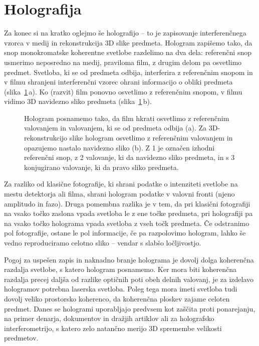 \section{Holografija}
Za konec si na kratko oglejmo še holografijo -- to je zapisovanje interferenčnega vzorca v medij
in rekonstrukcija 3D slike predmeta. Hologram zapišemo tako, da snop monokromatske
koherentne svetlobe razdelimo na dva dela: referenčni snop usmerimo neposredno na medij, 
praviloma film, z drugim
delom pa osvetlimo predmet. Svetloba, ki se od predmeta odbija, interferira z referenčnim
snopom in v filmu shranjeni interferenčni vzorec ohrani informacijo o obliki predmeta 
(slika~\ref{fig:08_hologram}\,a). Ko
(razvit) film ponovno osvetlimo z referenčnim snopom, v filmu vidimo 3D navidezno 
sliko predmeta (slika~\ref{fig:08_hologram}\,b).
\begin{figure}[ht]
\centering
\def\svgwidth{130truemm} 

\caption{Hologram posnamemo tako, da film hkrati osvetlimo z referenčnim valovanjem in 
valovanjem, ki se od predmeta odbija (a). Za 3D-rekonstrukcijo slike hologram osvetlimo
z referenčnim valovanjem in opazujemo nastalo navidezno sliko (b). Z 1 je označen izhodni referenčni
snop, z 2 valovanje, ki da navidezno sliko predmeta, in s 3 konjugirano 
valovanje, ki da pravo sliko predmeta. 
}
\label{fig:08_hologram}
\end{figure}

Za razliko od klasične fotografije, ki shrani podatke o intenziteti svetlobe
na mestu detektorja ali filma, shrani hologram podatke v valovni fronti (njeno 
amplitudo in fazo). Druga pomembna razlika je v tem, da pri klasični fotografiji na vsako točko
zaslona vpada svetloba le z ene točke predmeta, pri holografiji pa na vsako točko holograma
vpada svetloba z vseh točk predmeta. Če odstranimo pol fotografije, ostane le pol informacije, 
če pa razpolovimo hologram, lahko še vedno reproduciramo celotno sliko -- vendar s slabšo 
ločljivostjo.

Pogoj za uspešen zapis in naknadno branje holograma je dovolj dolga koherenčna razdalja svetlobe, 
s katero hologram posnamemo. Ker mora biti koherenčna razdalja precej daljša od razlike
optičnih poti obeh delnih valovanj, je za izdelavo hologramov potrebna laserska svetloba.
Poleg tega mora imeti svetloba tudi dovolj veliko prostorsko koherenco, da koherenčna
ploskev zajame celoten predmet. Danes se hologrami uporabljajo predvsem kot zaščita
proti ponarejanju, na primer denarja, dokumentov in dražjih artiklov ali za 
holografsko interferometrijo, s katero zelo natančno merijo 3D spremembe velikosti predmetov. 

